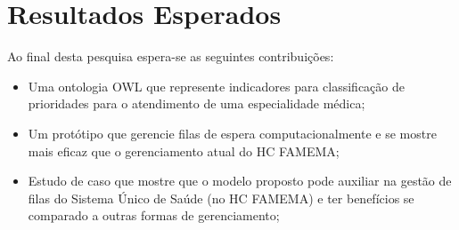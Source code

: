     \pagebreak
    
   \section{ Resultados Esperados}

	Ao final desta pesquisa espera-se as seguintes contribuições:
	
	\begin{itemize}
		\item Uma ontologia OWL que represente indicadores para classificação de prioridades para o atendimento de uma especialidade médica;
        \item  Um protótipo que gerencie filas de espera computacionalmente e se mostre  mais eficaz que o gerenciamento atual do HC FAMEMA;
        \item Estudo de caso que mostre que o modelo proposto pode auxiliar na gestão de filas do Sistema Único de Saúde (no HC FAMEMA) e ter benefícios se comparado a outras formas de gerenciamento;
	\end{itemize}
